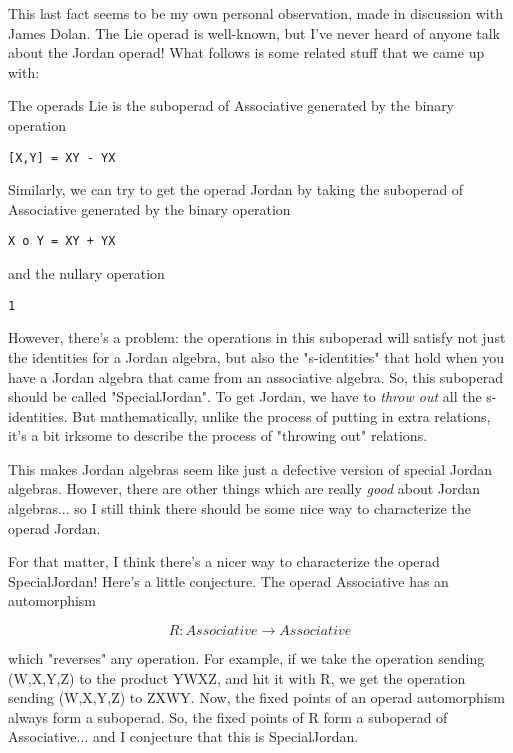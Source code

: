 This last fact seems to be my own personal observation, made in
discussion with James Dolan.  The Lie operad is well-known, but I've
never heard of anyone talk about the Jordan operad!  What follows is
some related stuff that we came up with:

The operads Lie is the suboperad of Associative generated by the
binary operation

\begin{verbatim}
[X,Y] = XY - YX 
\end{verbatim}
    
Similarly, we can try to get the operad Jordan by taking the suboperad 
of Associative generated by the binary operation

\begin{verbatim}
X o Y = XY + YX
\end{verbatim}
    
and the nullary operation 

\begin{verbatim}
1
\end{verbatim}
    
However, there's a problem: the operations in this suboperad will
satisfy not just the identities for a Jordan algebra, but also the
"s-identities" that hold when you have a Jordan algebra that came 
from an associative algebra.  So, this suboperad should be called
"SpecialJordan".  To get Jordan, we have to \emph{throw out} 
all the
s-identities.  But mathematically, unlike the process of putting
in extra relations, it's a bit irksome to describe the process of
"throwing out" relations. 

This makes Jordan algebras seem like just a defective version of special
Jordan algebras.  However, there are other things which are really
\emph{good} about Jordan algebras... so I still think there should be some
nice way to characterize the operad Jordan.

For that matter, I think there's a nicer way to characterize the operad
SpecialJordan!  Here's a little conjecture.  The operad Associative has
an automorphism

$$
R: Associative \to  Associative
$$
    

which "reverses" any operation.  For example, if we take the
operation sending (W,X,Y,Z) to the product YWXZ, and hit it with R, we
get the operation sending (W,X,Y,Z) to ZXWY.  Now, the fixed points of
an operad automorphism always form a suboperad.  So, the fixed points of
R form a suboperad of Associative... and I conjecture that this is
SpecialJordan.

